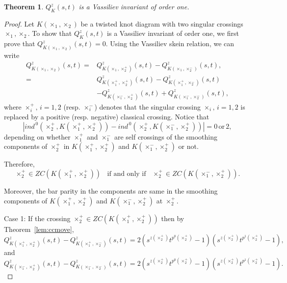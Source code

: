 \documentclass[10pt,a4paper,reqno]{amsart}
\newtheorem{theorem}{Theorem}[section]
\theoremstyle{definition}
\theoremstyle{remark}
\begin{document}
\begin{theorem}
	$Q^{z}_{K}(s,t)$ is a Vassiliev invariant of order one.
\end{theorem}
\begin{proof}
	Let $K(\times_{1}, \times_{2})$ be a twisted knot diagram with two singular crossings $\times_{1}, \times_{2}$. To show that $Q^{z}_{K}(s,t)$ is a Vassiliev invariant of order one, we first prove that $Q^{z}_{K(\times_{1}, \times_{2})}(s,t)=0$.
	Using the Vassiliev skein relation, we can write
	\begin{align*}
		Q^{z}_{K(\times_{1}, \times_{2})}(s,t)=& Q^{z}_{K(\times_{1}, \times_{2}^{+})}(s,t)-Q^{z}_{K(\times_{1}, \times_{2}^{-})}(s,t),\\
		=& Q^{z}_{K(\times_{1}^{+}, \times_{2}^{+})}(s,t)-Q^{z}_{K(\times_{1}^{+}, \times_{2}^{-})}(s,t)\\
		&-Q^{z}_{K(\times_{1}^{-}, \times_{2}^{+})}(s,t)+Q^{z}_{K(\times_{1}^{-}, \times_{2}^{-})}(s,t),
	\end{align*}		
where $\times_{i}^{+},\,i=1,2$ (resp. $\times_{i}^{-}$) denotes that the singular crossing $\times_{i},\,i=1,2$ is replaced by a positive (resp. negative) classical crossing.
Notice that \[|ind^{\,0} ( \times_{2}^{+}, K(\times_{1}^{+}, \times_{2}^{+}) ) - ind^{\,0}(\times_{2}^{+}, K(\times_{1}^{-}, \times_{2}^{+}) )| =0\, \text{or}\,2,\]
depending on whether
 $\times_{1}^{+}$ and $\times_{1}^{-}$ are self crossings of the smoothing components of $\times_{2}^{+}$ in $ K(\times_{1}^{+}, \times_{2}^{+})$ and $ K(\times_{1}^{-}, \times_{2}^{+})$ or not. 

 Therefore, $$ \times_{2}^{+} \in ZC(K(\times_{1}^{+}, \times_{2}^{+}))\;\; \text{ if and only if } \;\;\times_{2}^{+} \in ZC(K(\times_{1}^{-}, \times_{2}^{+})).$$
 
  Moreover, the bar parity in the components are same in the smoothing components of $K(\times_{1}^{+}, \times_{2}^{+})  $ and $K(\times_{1}^{-}, \times_{2}^{+}) $ at $\times_{2}^{+}$.


Case 1: If the crossing $\times_{2}^{+} \in ZC(K(\times_{1}^{+}, \times_{2}^{+}))$ then by Theorem~\ref{lem:ccmove},
	\[Q^{z}_{K(\times_{1}^{+}, \times_{2}^{+})}(s,t)-Q^{z}_{K(\times_{1}^{+}, \times_{2}^{-})}(s,t)= 2(s^{z(\times_{2}^{+})}t^{p^{0}(\times_{2}^{+})}-1)(s^{z(\times_{2}^{+})}t^{p^{1}(\times_{2}^{+})}-1),\]
and
	\[Q^{z}_{K(\times_{1}^{-}, \times_{2}^{+})}(s,t)-Q^{z}_{K(\times_{1}^{-}, \times_{2}^{-})}(s,t)= 2(s^{z(\times_{2}^{+})}t^{p^{0}( \times_{2}^{+})}-1)(s^{z(\times_{2}^{+})}t^{p^{1}(\times_{2}^{+})}-1).\]



\end{proof}
\end{document}
